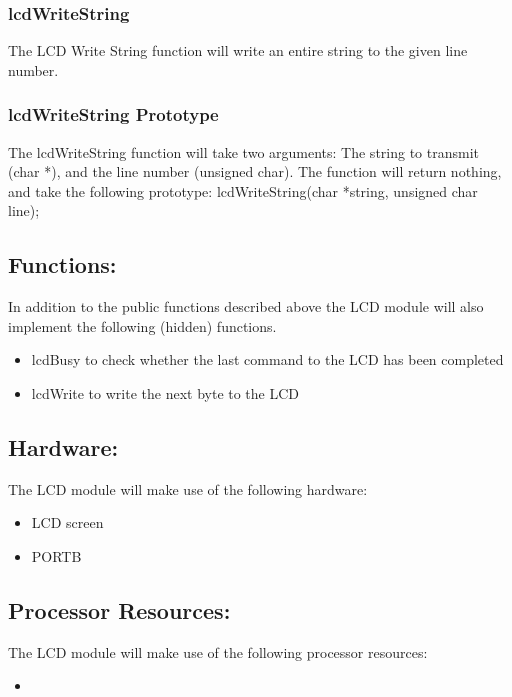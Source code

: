 \documentclass[]{article}
\begin{document}
\subsubsection{lcdWriteString}
The LCD Write String function will write an entire string to the given line number.

\subsubsection{lcdWriteString Prototype}
The lcdWriteString function will take two arguments: The string to transmit (char *), and the line number (unsigned char). The function will return nothing, and take the following prototype: \newline \newline
lcdWriteString(char *string, unsigned char line);

\subsection{Functions:}
In addition to the public functions described above the LCD module will also implement the following (hidden) functions.
\begin{itemize}
	\item lcdBusy to check whether the last command to the LCD has been completed
	\item lcdWrite to write the next byte to the LCD
\end{itemize}

\subsection{Hardware:}
The LCD module will make use of the following hardware:
\begin{itemize}
	\item LCD screen
	\item PORTB
\end{itemize}

\subsection{Processor Resources:}
The LCD module will make use of the following processor resources:
\begin{itemize}
	\item 
\end{itemize}
\end{document}
